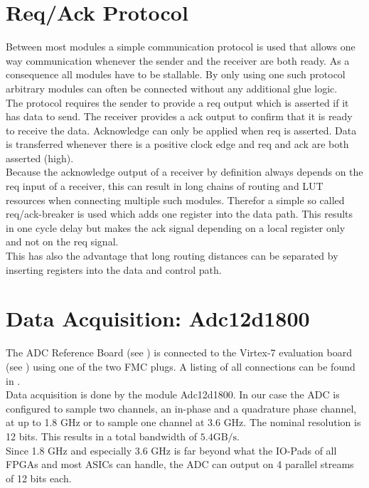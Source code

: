 \section{Req/Ack Protocol}
\label{sec:fpga_reqack}
Between most modules a simple communication protocol is used that allows
one way communication whenever the sender and the receiver are both
ready. As a consequence all modules have to be stallable. By only using
one such protocol arbitrary modules can often be connected
without any additional glue logic. \\

The protocol requires the sender to provide a \acrfull{req} output which
is asserted if it has data to send. The receiver provides a \acrfull{ack}
output to confirm that it is ready to receive the data.
Acknowledge can only be applied when \gls{req} is asserted.
Data is transferred whenever there is a positive clock edge and
\gls{req} and \gls{ack} are both asserted (high). \\

Because the acknowledge output of a receiver by definition always depends on the
\gls{req} input of a receiver, this can result in long chains of routing and
\gls{LUT} resources when connecting multiple such modules.
Therefor a simple so called \gls{req}/\gls{ack}-breaker is used which adds one
register into the data path. This results in one cycle delay but makes the
\gls{ack} signal depending on a local register only and not on the
\gls{req} signal. \\

This has also the advantage that long routing distances can be separated by
inserting registers into the data and control path. \\

\section{Data Acquisition: Adc12d1800}
\label{sec:fpga_adc}

The \gls{ADC} Reference Board (see ) is connected
to the Virtex-7 evaluation board (see )
using one of the two \gls{FMC} plugs.
A listing of all connections can be found in . \\

Data acquisition is done by the module Adc12d1800. In our case the ADC is
configured to sample two channels, an in-phase and a quadrature phase channel,
at up to 1.8 GHz or to sample one channel at 3.6 GHz.
The nominal resolution is 12 bits. This results in a total bandwidth of
$5.4 \text{GB}/\text{s}$. \\
Since 1.8 GHz and especially 3.6 GHz is far beyond what the IO-Pads of all
\glspl{FPGA}  and most \glspl{ASIC} can handle,
the ADC can output on 4 parallel streams of 12 bits each. \\


